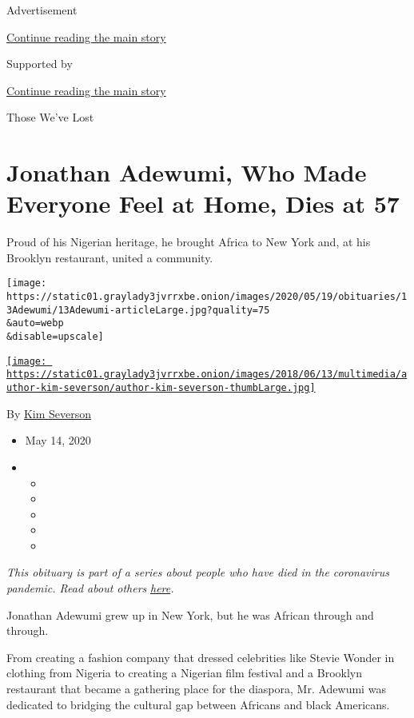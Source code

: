 Advertisement

\protect\hyperlink{after-top}{Continue reading the main story}

Supported by

\protect\hyperlink{after-sponsor}{Continue reading the main story}

Those We've Lost

\hypertarget{jonathan-adewumi-who-made-everyone-feel-at-home-dies-at-57}{%
\section{Jonathan Adewumi, Who Made Everyone Feel at Home, Dies at
57}\label{jonathan-adewumi-who-made-everyone-feel-at-home-dies-at-57}}

Proud of his Nigerian heritage, he brought Africa to New York and, at
his Brooklyn restaurant, united a community.

\texttt{[image: https://static01.graylady3jvrrxbe.onion/images/2020/05/19/obituaries/13Adewumi/13Adewumi-articleLarge.jpg?quality=75\\\&auto=webp\\\&disable=upscale]}

\href{https://www.nytimes3xbfgragh.onion/by/kim-severson}{\texttt{[image: https://static01.graylady3jvrrxbe.onion/images/2018/06/13/multimedia/author-kim-severson/author-kim-severson-thumbLarge.jpg]}}

By \href{https://www.nytimes3xbfgragh.onion/by/kim-severson}{Kim
Severson}

\begin{itemize}
\item
  May 14, 2020
\item
  \begin{itemize}
  \item
  \item
  \item
  \item
  \item
  \end{itemize}
\end{itemize}

\emph{This obituary is part of a series about people who have died in
the coronavirus pandemic. Read about others}
\href{https://www.nytimes3xbfgragh.onion/series/people-who-have-died-of-the-coronavirus}{\emph{here}}\emph{.}

Jonathan Adewumi grew up in New York, but he was African through and
through.

From creating a fashion company that dressed celebrities like Stevie
Wonder in clothing from Nigeria to creating a Nigerian film festival and
a Brooklyn restaurant that became a gathering place for the diaspora,
Mr. Adewumi was dedicated to bridging the cultural gap between Africans
and black Americans.

